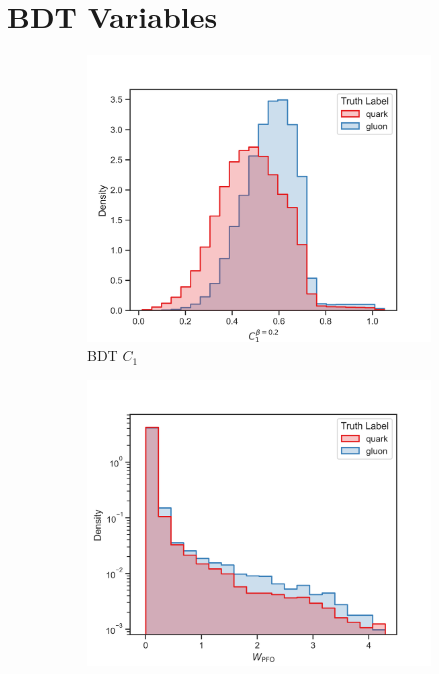 \section{BDT Variables}
\label{sec:app_bdt_variables}
\begin{figure}[!htb]
    \centering
    \begin{subfigure}[t]{0.45\textwidth}
        \includegraphics[width=\linewidth]{src/plots/distributions/BDT/C1_PFO_jet.png}
        \caption{BDT $C_1$}
        \label{fig:app_bdt_C1}
    \end{subfigure}
    \begin{subfigure}[t]{0.45\textwidth}
        \includegraphics[width=\linewidth]{src/plots/distributions/BDT/W_PFO_jet.png}

\end{subfigure}
\end{figure}
